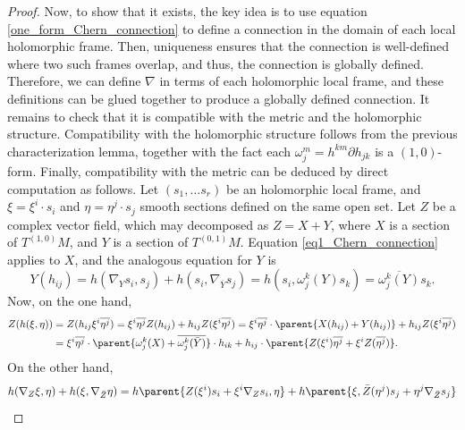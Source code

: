 \begin{proof}
    Now, to show that it exists, the key idea is to use equation \ref{one_form_Chern_connection} to define a connection in the domain of each local holomorphic frame. Then, uniqueness ensures that the connection is well-defined where two such frames overlap, and thus, the connection is globally defined. Therefore, we can define \(\nabla\) in terms of each holomorphic local frame, and these definitions can be glued together to produce a globally defined connection. It remains to check that it is compatible with the metric and the holomorphic structure. Compatibility with the holomorphic structure follows from the previous characterization lemma, together with the fact each \(\omega^m_j=h^{km} \partial h_{jk}\) is a \((1,0)\)-form. Finally, compatibility with the metric can be deduced by direct computation as follows. Let \((s_1, \ldots s_r)\) be an holomorphic local frame, and \(\xi = \xi^i \cdot s_i\) and \(\eta=\eta^j\cdot s_j\) smooth sections defined on the same open set. Let \(Z\) be a complex vector field, which may decomposed as \(Z=X+Y\), where \(X\) is a section of \(T^{(1,0)}M\), and \(Y\) is a section of \(T^{(0,1)}M\). Equation \ref{eq1_Chern_connection} applies to \(X\), and the analogous equation for \(Y\) is
    \begin{equation} \label{eq2_Chern_connection}
        Y(h_{ij})=h(\nabla_{ Y} s_i, s_j)+h(s_i, \nabla_{\bar{Y}} s_j)=h(s_i, \omega^k_j(Y)s_k)=\overline{\omega^k_j(Y)} s_k.
    \end{equation}
    Now, on the one hand,
    \begin{align} \label{eq3_Chern_connection}
        \begin{split}
        Z(h(\xi, \eta)) & =Z(h_{ij} \xi^i \overline{\eta^j})=\xi^i \overline{\eta^j} Z(h_{ij}) + h_{ij} Z(\xi ^i \overline{\eta^j} )=\xi^i\overline{\eta^j}\cdot \parent{X(h_{ij}) + Y(h_{ij})} + h_{ij} Z(\xi ^i \overline{\eta^j} ) \\
        & = \xi^i  \overline{\eta^j}\cdot \parent{\omega^k_j(X) + \overline{\omega^k_j(\bar{Y})}}\cdot h_{ik} + h_{ij} \cdot \parent{Z(\xi^i)\overline{\eta^j} + \xi^i Z(\overline{\eta^j})}.
        \end{split}
    \end{align}
    On the other hand,
    \begin{align} \label{eq4_Chern_connection}
        \begin{split}
        h(\nabla_Z \xi, \eta) + h(\xi, \nabla_{\bar{Z}} \eta) & = h\parent{Z(\xi^i)s_i + \xi^i \nabla_Z s_i, \eta} +h\parent{\xi, \bar{Z}(\eta^j)s_j+\eta^j \nabla_{\bar{Z}}s_j}\\

\end{split}
\end{align}
\end{proof}
